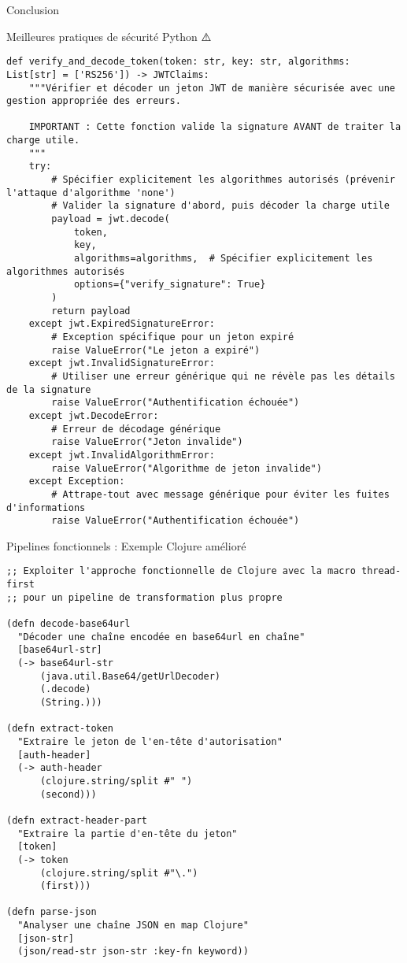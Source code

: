 \documentclass[presentation,aspectratio=169]{beamer}
\begin{document}
\begin{frame}[label={sec:orgc6c3753},fragile]{Conclusion}
\begin{block}{Meilleures pratiques de sécurité Python ⚠️}
\begin{verbatim}
def verify_and_decode_token(token: str, key: str, algorithms: List[str] = ['RS256']) -> JWTClaims:
    """Vérifier et décoder un jeton JWT de manière sécurisée avec une gestion appropriée des erreurs.

    IMPORTANT : Cette fonction valide la signature AVANT de traiter la charge utile.
    """
    try:
        # Spécifier explicitement les algorithmes autorisés (prévenir l'attaque d'algorithme 'none')
        # Valider la signature d'abord, puis décoder la charge utile
        payload = jwt.decode(
            token,
            key,
            algorithms=algorithms,  # Spécifier explicitement les algorithmes autorisés
            options={"verify_signature": True}
        )
        return payload
    except jwt.ExpiredSignatureError:
        # Exception spécifique pour un jeton expiré
        raise ValueError("Le jeton a expiré")
    except jwt.InvalidSignatureError:
        # Utiliser une erreur générique qui ne révèle pas les détails de la signature
        raise ValueError("Authentification échouée")
    except jwt.DecodeError:
        # Erreur de décodage générique
        raise ValueError("Jeton invalide")
    except jwt.InvalidAlgorithmError:
        raise ValueError("Algorithme de jeton invalide")
    except Exception:
        # Attrape-tout avec message générique pour éviter les fuites d'informations
        raise ValueError("Authentification échouée")
\end{verbatim}
\end{block}
\begin{block}{Pipelines fonctionnels : Exemple Clojure amélioré 🧩}
\begin{verbatim}
;; Exploiter l'approche fonctionnelle de Clojure avec la macro thread-first
;; pour un pipeline de transformation plus propre

(defn decode-base64url
  "Décoder une chaîne encodée en base64url en chaîne"
  [base64url-str]
  (-> base64url-str
      (java.util.Base64/getUrlDecoder)
      (.decode)
      (String.)))

(defn extract-token
  "Extraire le jeton de l'en-tête d'autorisation"
  [auth-header]
  (-> auth-header
      (clojure.string/split #" ")
      (second)))

(defn extract-header-part
  "Extraire la partie d'en-tête du jeton"
  [token]
  (-> token
      (clojure.string/split #"\.")
      (first)))

(defn parse-json
  "Analyser une chaîne JSON en map Clojure"
  [json-str]
  (json/read-str json-str :key-fn keyword))


\end{verbatim}
\end{block}
\end{frame}
\end{document}
